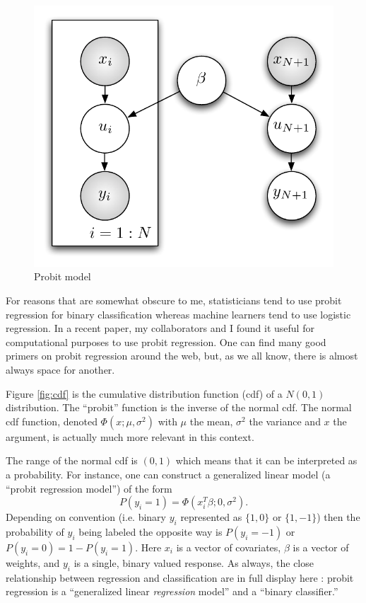 \begin{figure}[htbp]
\begin{center}
\includegraphics{Chapters/chapter1/probit}
\caption{Probit model}
\label{fig:probit}
\end{center}
\end{figure}




For reasons that are somewhat obscure to me, statisticians tend to use probit regression for binary classification whereas machine learners tend to use logistic regression.  In a recent paper, my collaborators and I found it useful for computational purposes to use probit regression.  One can find many good primers on probit regression around the web, but, as we all know, there is almost always space for another.  

Figure \ref{fig:cdf} is the cumulative distribution function (cdf) of a $N(0,1)$ distribution.  The ``probit'' function is the inverse of the normal cdf.    The normal cdf function, denoted $\Phi(x;\mu,\sigma^2)$ with $\mu$ the mean, $\sigma^2$ the variance and $x$ the argument, is actually much more relevant in this context.

The range of the normal cdf is $(0,1)$ which means that it can be interpreted as a probability.  For instance, one can construct a generalized linear model (a ``probit regression model'') of the form 
\begin{equation}
P(y_i = 1) = \Phi(x_i^T\beta; 0, \sigma^2). \label{eqn:probit}
\end{equation}  Depending on convention (i.e. binary $y_i$ represented as $\{1,0\}$ or $\{1,-1\}$) then the probability of $y_i$ being labeled the opposite way is $P(y_i = -1)$ or $P(y_i = 0) = 1 - P(y_i=1).$  Here $x_i$ is a vector of covariates, $\beta$ is a vector of weights, and $y_i$ is a single, binary valued response.  As always, the close relationship between regression and classification are in full display here : probit regression is a ``generalized linear {\em regression} model'' and a ``binary classifier.''

